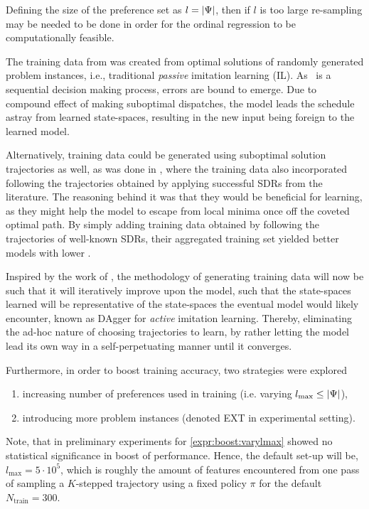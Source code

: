 \documentclass[smallextended]{svjour3}
\begin{document}
	Defining the size of the preference set as $l=\lvert\Psi\rvert$, then if  $l$ is too 
	large re-sampling may be needed to be done in order for the ordinal regression 
	to be computationally feasible. 
	
	The training data from \cite{InRu11a} was created from optimal solutions of 
	randomly generated problem instances, i.e., traditional \emph{passive} 
	imitation learning (IL). 
	As \JSP\ is a sequential decision making process, errors are bound to emerge.  
	Due to compound effect of making suboptimal dispatches, the model leads the 
	schedule astray from learned state-spaces, resulting in the new input being 
	foreign to the learned model. 
	
	Alternatively, training data could be generated using suboptimal solution 
	trajectories as well, as was done in \cite{InRu15a}, where the training data 
	also incorporated following the trajectories obtained by applying successful 
	SDRs from the literature. 
	The reasoning behind it was that  they would be beneficial for learning, 
	as they might help the model to escape from local minima once off the coveted 
	optimal path. 
	By simply adding training data obtained by following the trajectories of 
	well-known SDRs, their aggregated training set yielded better models with lower 
	\fullnamerho. 
	
	Inspired by the work of \cite{RossB10,RossGB11}, the methodology of generating 
	training data will now be such that it will iteratively improve upon the model, 
	such that the state-spaces learned will be representative of the state-spaces 
	the eventual model would likely encounter, known as DAgger for \emph{active} 
	imitation learning.
	Thereby, eliminating the ad-hoc nature of choosing trajectories to learn, by 
	rather letting the model lead its own way in a self-perpetuating manner until 
	it converges.
	
	Furthermore, in order to boost training accuracy, two strategies were explored 
	\begin{enumerate}[after={{}}, leftmargin=*,
		label={\textbf{Boost.\arabic*}}, ref={{Boost.\arabic*}}]
		\item \label{expr:boost:varylmax} increasing number of preferences used 
		in training (i.e. varying \mbox{$l_{\max} \leq \lvert\Psi\rvert$}),
		\item \label{expr:boost:newdata} introducing more problem instances (denoted 
		EXT in experimental setting).
	\end{enumerate}
	Note, that in preliminary experiments for \ref{expr:boost:varylmax} showed no 
	statistical significance in boost of performance. Hence, the default set-up 
	will be, $l_{\max}=5 \cdot 10^5$, which is roughly the amount of features 
	encountered from one pass of sampling a \mbox{$K$-stepped} trajectory using a 
	fixed policy $\pi$ for the default $N_{\text{train}}=300$.
	
\end{document}
